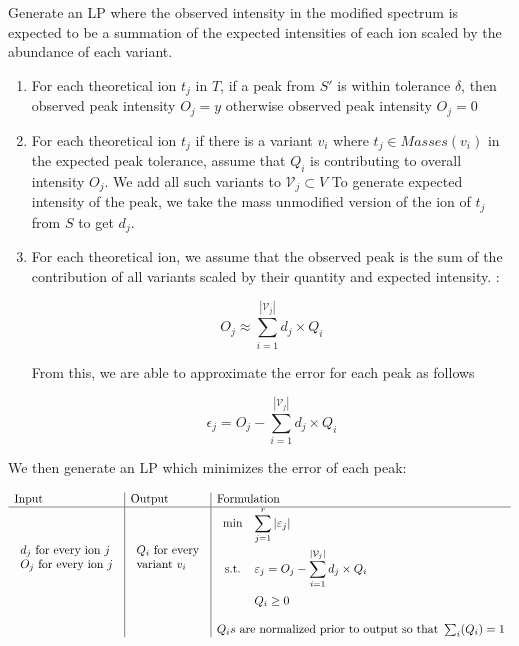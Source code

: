 \documentclass[11pt]{article}
\begin{document}
Generate an LP where the observed intensity in the modified spectrum is expected to be a summation of the expected intensities of each ion scaled by the abundance of each variant. 
\begin{enumerate}
\item For each theoretical ion $t_j$ in $T$, if a peak from $S'$ is within tolerance $\delta$, then observed peak intensity $O_j = y$ otherwise observed peak intensity $O_j = 0$
\item For each theoretical ion $t_j$ if there is a variant $v_i$ where $t_j \in Masses(v_i)$ in the expected peak tolerance, assume that $Q_i$ is contributing to overall intensity $O_j$. We add all such variants to $\mathcal{V}_j \subset V$ To generate expected intensity of the peak, we take the mass unmodified version of the ion of $t_j$ from $S$ to get $d_j$.
\item For each theoretical ion, we assume that the observed peak is the sum of the contribution of all variants scaled by their quantity and expected intensity. :

\[
O_j \approx \sum_{i=1}^{|\mathcal{V}_j|}  d_j \times {Q_i}
\]

From this, we are able to approximate the error for each peak as follows

\[
\epsilon_j = O_j - \sum_{i=1}^{|\mathcal{V}_j|} d_j \times{Q_i}
\]
\end{enumerate}

We then generate an LP which minimizes the error of each peak:

\[
\begin{array}{l|l|l}
{\rm Input} & {\rm Output} & {\rm Formulation} \\
\hline
\begin{array}{l}
d_j \mbox{ for every ion } j \\
O_j \mbox{ for every ion } j \\
\end{array}&
\begin{array}{l} Q_i \mbox{ for every}\\
\mbox{variant } v_i \\
\end{array}&
\begin{array}{cll}
\min &{\displaystyle \sum_{j=1}^{r}{|\varepsilon_j|}}\\[1.5em]
{\rm s.t.}&{\displaystyle \varepsilon_j = O_j - \sum_{i=1}^{|\mathcal{V}_j|} d_j \times{Q_i} }\\
[1.5em]
&{\displaystyle Q_i\geq 0} \\
\end{array}\\
&&\\
&&Q_is\mbox{ are normalized prior to output so that } \sum_i(Q_i) = 1\\
\end{array}\\
\]
\end{document}
